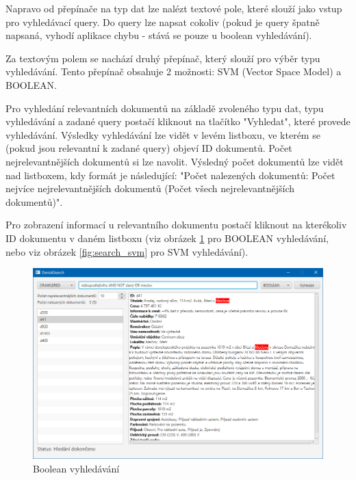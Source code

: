 \documentclass[12pt, a4paper]{article}
\begin{document}
Napravo od přepínače na typ dat lze nalézt textové pole, které slouží jako vstup pro vyhledávací query. Do query lze napsat cokoliv (pokud je query špatně napsaná, vyhodí aplikace chybu - stává se pouze u boolean vyhledávání).

Za textovým polem se nachází druhý přepínač, který slouží pro výběr typu vyhledávání. Tento přepínač obsahuje 2 možnosti: SVM (Vector Space Model) a BOOLEAN.

Pro vyhledání relevantních dokumentů na základě zvoleného typu dat, typu vyhledávání a zadané query postačí kliknout na tlačítko "Vyhledat", které provede vyhledávání. Výsledky vyhledávání lze vidět v levém listboxu, ve kterém se (pokud jsou relevantní k zadané query) objeví ID dokumentů. Počet nejrelevantnějších dokumentů si lze navolit. Výsledný počet dokumentů lze vidět nad listboxem, kdy formát je následující: "Počet nalezených dokumentů: Počet nejvíce nejrelevantnějších dokumentů (Počet všech nejrelevantnějších dokumentů)".

Pro zobrazení informací u relevantního dokumentu postačí kliknout na kterékoliv ID dokumentu v daném listboxu (viz obrázek \ref{fig:search_boolean} pro BOOLEAN vyhledávání, nebo viz obrázek \ref{fig:search_svm} pro SVM vyhledávání).

\begin{figure}[h]
	\centering
	\includegraphics[width=15cm]{img/search_boolean.png}
	\caption{Boolean vyhledávání}
	\label{fig:search_boolean}
\end{figure}
\newpage
\end{document}
